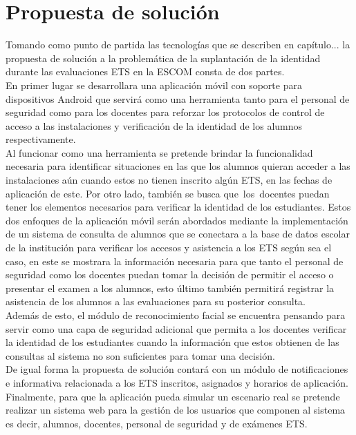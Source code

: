 
\section{Propuesta de solución}

Tomando como punto de partida las tecnologías que se describen en capítulo... la propuesta de solución a la problemática de la suplantación de la identidad durante las  evaluaciones ETS en la ESCOM consta de dos partes. \\

En primer lugar se desarrollara una aplicación móvil con soporte para dispositivos Android que servirá como una herramienta tanto para el personal de seguridad como para los docentes para reforzar los protocolos de control de acceso a las instalaciones y verificación de la identidad de los alumnos respectivamente. \\

Al funcionar como una herramienta se pretende brindar la funcionalidad necesaria para identificar situaciones en las que los alumnos quieran acceder a las instalaciones aún cuando estos no tienen inscrito algún ETS, en las fechas de aplicación de este.
Por otro lado, también se busca que los docentes puedan tener los elementos necesarios para verificar la identidad de los estudiantes.
Estos dos enfoques de la aplicación móvil serán abordados mediante la implementación de un sistema de consulta de alumnos que se conectara a la base de datos escolar de la institución para verificar los accesos y asistencia a los ETS según sea el caso, en este se mostrara la información necesaria para que tanto el personal de seguridad como los docentes puedan tomar la decisión de permitir el acceso o presentar el examen a los alumnos, esto último también permitirá registrar la asistencia de los alumnos a las evaluaciones para su posterior consulta.\\

Además de esto, el módulo de reconocimiento facial se encuentra pensando para servir como una capa de seguridad adicional que permita a los docentes verificar la identidad de los estudiantes cuando la información que estos obtienen de las consultas al sistema no son suficientes para tomar una decisión.\\

De igual forma la propuesta de solución contará con un módulo de notificaciones e informativa relacionada a los ETS inscritos, asignados y horarios de aplicación.\\

Finalmente, para que la aplicación pueda simular un escenario real se pretende realizar un sistema web para la gestión de los usuarios que componen al sistema es decir, alumnos, docentes, personal de seguridad y de exámenes ETS.






